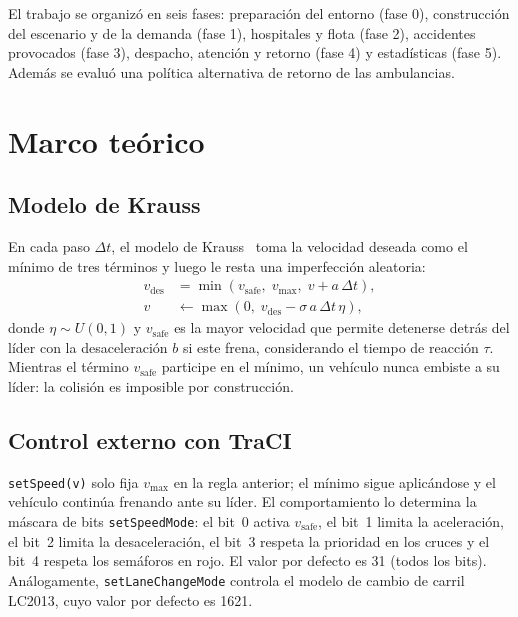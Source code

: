 \documentclass[conference,a4paper]{IEEEtran}
\begin{document}
El trabajo se organizó en seis fases: preparación del entorno (fase 0), construcción del
escenario y de la demanda (fase 1), hospitales y flota (fase 2), accidentes provocados
(fase 3), despacho, atención y retorno (fase 4) y estadísticas (fase 5). Además se
evaluó una política alternativa de retorno de las ambulancias.

\section{Marco teórico}
\subsection{Modelo de Krauss}
En cada paso $\Delta t$, el modelo de Krauss~\cite{krauss} toma la velocidad deseada
como el mínimo de tres términos y luego le resta una imperfección aleatoria:
\begin{align}
v_{\mathrm{des}} &= \min\left(v_{\mathrm{safe}},\; v_{\max},\; v + a\,\Delta t\right),\\
v &\leftarrow \max\!\left(0,\; v_{\mathrm{des}} - \sigma\, a\, \Delta t\, \eta\right),
\end{align}
donde $\eta\sim U(0,1)$ y $v_{\mathrm{safe}}$ es la mayor velocidad que permite detenerse
detrás del líder con la desaceleración $b$ si este frena, considerando el tiempo de
reacción $\tau$. Mientras el término $v_{\mathrm{safe}}$ participe en el mínimo, un
vehículo nunca embiste a su líder: la colisión es imposible por construcción.

\subsection{Control externo con TraCI}
\texttt{setSpeed(v)} solo fija $v_{\max}$ en la regla anterior; el mínimo sigue
aplicándose y el vehículo continúa frenando ante su líder. El comportamiento lo
determina la máscara de bits \texttt{setSpeedMode}: el bit~0 activa $v_{\mathrm{safe}}$,
el bit~1 limita la aceleración, el bit~2 limita la desaceleración, el bit~3 respeta la
prioridad en los cruces y el bit~4 respeta los semáforos en rojo. El valor por defecto
es 31 (todos los bits). Análogamente, \texttt{setLaneChangeMode} controla el modelo de
cambio de carril LC2013, cuyo valor por defecto es 1621.

\end{document}

